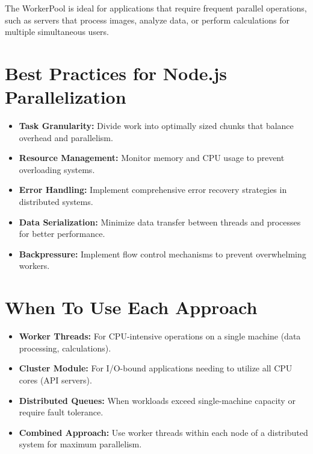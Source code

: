 \documentclass[12pt,letterpaper]{article}
\begin{document}
The WorkerPool is ideal for applications that require frequent parallel operations, such as servers that process images, analyze data, or perform calculations for multiple simultaneous users.

\section{Best Practices for Node.js Parallelization}

\begin{itemize}
    \item \textbf{\textcolor{accentColor}{Task Granularity:}} Divide work into optimally sized chunks that balance overhead and parallelism.
    
    \item \textbf{\textcolor{accentColor}{Resource Management:}} Monitor memory and CPU usage to prevent overloading systems.
    
    \item \textbf{\textcolor{accentColor}{Error Handling:}} Implement comprehensive error recovery strategies in distributed systems.
    
    \item \textbf{\textcolor{accentColor}{Data Serialization:}} Minimize data transfer between threads and processes for better performance.
    
    \item \textbf{\textcolor{accentColor}{Backpressure:}} Implement flow control mechanisms to prevent overwhelming workers.
\end{itemize}

\section{When To Use Each Approach}

\begin{itemize}
    \item \textbf{\textcolor{accentColor}{Worker Threads:}} For CPU-intensive operations on a single machine (data processing, calculations).
    
    \item \textbf{\textcolor{accentColor}{Cluster Module:}} For I/O-bound applications needing to utilize all CPU cores (API servers).
    
    \item \textbf{\textcolor{accentColor}{Distributed Queues:}} When workloads exceed single-machine capacity or require fault tolerance.
    
    \item \textbf{\textcolor{accentColor}{Combined Approach:}} Use worker threads within each node of a distributed system for maximum parallelism.
\end{itemize}
\end{document}
